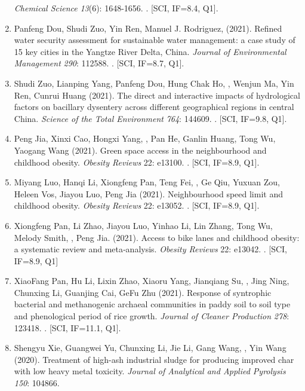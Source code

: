 \begin{enumerate}
    \textit{Chemical Science} \textit{13}(6): 1648-1656.
    . [SCI, IF=8.4, Q1].
\item
    Panfeng Dou, Shudi Zuo, Yin Ren, Manuel J. Rodriguez, \Shaoqing \enspace (2021).
    Refined water security assessment for sustainable water management: a case study of 15 key cities in the Yangtze River Delta, China.
    \textit{Journal of Environmental Management} \textit{290}: 112588.
    . [SCI, IF=8.7, Q1].
\item
    Shudi Zuo, Lianping Yang, Panfeng Dou, Hung Chak Ho, \Shaoqing, Wenjun Ma, Yin Ren, Cunrui Huang (2021).
    The direct and interactive impacts of hydrological factors on bacillary dysentery across different geographical regions in central China.
    \textit{Science of the Total Environment} \textit{764}: 144609.
    . [SCI, IF=9.8, Q1].
\item
    Peng Jia, Xinxi Cao, Hongxi Yang, \Shaoqing, Pan He, Ganlin Huang, Tong Wu, Yaogang Wang (2021).
    Green space access in the neighbourhood and childhood obesity.
    \textit{Obesity Reviews} 22: e13100.
    . [SCI, IF=8.9, Q1].
\item
    Miyang Luo, Hanqi Li, Xiongfeng Pan, Teng Fei, \Shaoqing, Ge Qiu, Yuxuan Zou, Heleen Vos, Jiayou Luo, Peng Jia (2021).
    Neighbourhood speed limit and childhood obesity.
    \textit{Obesity Reviews} 22: e13052.
    . [SCI, IF=8.9, Q1].
\item
    Xiongfeng Pan, Li Zhao, Jiayou Luo, Yinhao Li, Lin Zhang, Tong Wu, Melody Smith, \Shaoqing, Peng Jia. (2021).
    Access to bike lanes and childhood obesity: a systematic review and meta‐analysis.
    \textit{Obesity Reviews} 22: e13042.
    . [SCI, IF=8.9, Q1]
\item
    XiaoFang Pan, Hu Li, Lixin Zhao, Xiaoru Yang, Jianqiang Su, \Shaoqing, Jing Ning, Chunxing Li, Guanjing Cai, GeFu Zhu (2021).
    Response of syntrophic bacterial and methanogenic archaeal communities in paddy soil to soil type and phenological period of rice growth.
    \textit{Journal of Cleaner Production} \textit{278}: 123418.
    . [SCI, IF=11.1, Q1].
\item
    Shengyu Xie, Guangwei Yu, Chunxing Li, Jie Li, Gang Wang, \Shaoqing, Yin Wang (2020).
    Treatment of high-ash industrial sludge for producing improved char with low heavy metal toxicity.
    \textit{Journal of Analytical and Applied Pyrolysis} \textit{150}: 104866.

\end{enumerate}
